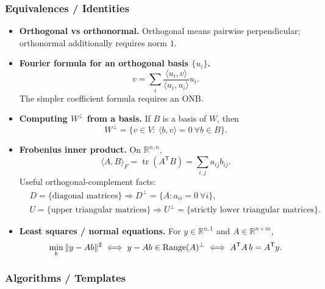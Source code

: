 \subsubsection*{Equivalences / Identities}

\begin{itemize}[leftmargin=*]
\item \textbf{Orthogonal vs orthonormal.} Orthogonal means pairwise perpendicular; orthonormal additionally requires norm $1$.

\item \textbf{Fourier formula for an orthogonal basis $\{u_i\}$.}
\[
v=\sum_i \frac{\langle u_i,v\rangle}{\langle u_i,u_i\rangle}u_i.
\]
The simpler coefficient formula requires an ONB.

\item \textbf{Computing $W^\perp$ from a basis.} If $B$ is a basis of $W$, then
\[
W^\perp=\{v\in V:\ \langle b,v\rangle=0\ \forall b\in B\}.
\]

\item \textbf{Frobenius inner product.} On $\mathbb R^{n,n}$,
\[
\langle A,B\rangle_F=\operatorname{tr}(A^\mathsf T B)=\sum_{i,j}a_{ij}b_{ij}.
\]
Useful orthogonal-complement facts:
\begin{align*}
&D=\{\text{diagonal matrices}\}\Rightarrow D^\perp=\{A:a_{ii}=0\ \forall i\},\\
&U=\{\text{upper triangular matrices}\}\Rightarrow U^\perp=\{\text{strictly lower triangular matrices}\}.
\end{align*}

\item \textbf{Least squares / normal equations.} For $y\in\mathbb R^{n,1}$ and $A\in\mathbb R^{n\times m}$,
\[
\min_b \|y-Ab\|^2
\iff
y-Ab\in\operatorname{Range}(A)^\perp
\iff
A^\mathsf T A\,b=A^\mathsf T y.
\]
\end{itemize}

\subsubsection*{Algorithms / Templates}

